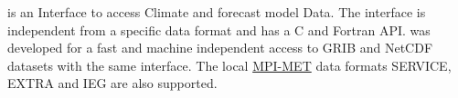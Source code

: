 {\CDI} is an Interface to access Climate and forecast model Data.
The interface is independent from a specific data format and has a C and Fortran API.
{\CDI} was developed for a fast and machine independent access to GRIB
and NetCDF datasets with the same interface.
The local \href{https://www.mpimet.mpg.de/}{MPI-MET} data formats SERVICE, EXTRA and 
IEG are also supported.



